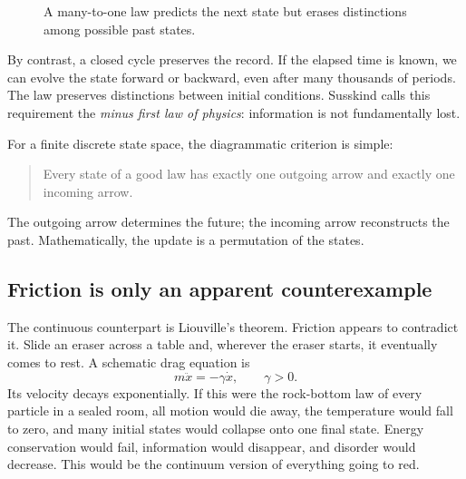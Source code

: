 \begin{figure}[htbp]
\centering
{}
\caption{A many-to-one law predicts the next state but erases distinctions
among possible past states.}
\label{fig:sm1-bad-law}
\end{figure}

By contrast, a closed cycle preserves the record. If the elapsed time is
known, we can evolve the state forward or backward, even after many thousands
of periods. The law preserves distinctions between initial conditions.
Susskind calls this requirement the \emph{minus first law of physics}:
information is not fundamentally lost.

For a finite discrete state space, the diagrammatic criterion is simple:
\begin{quote}
Every state of a good law has exactly one outgoing arrow and exactly one
incoming arrow.
\end{quote}
The outgoing arrow determines the future; the incoming arrow reconstructs
the past. Mathematically, the update is a permutation of the states.

\subsection{Friction is only an apparent counterexample}

The continuous counterpart is Liouville's theorem. Friction appears to
contradict it. Slide an eraser across a table and, wherever the eraser starts,
it eventually comes to rest. A schematic drag equation is
\begin{equation}
 m\ddot x=-\gamma\dot x,
 \qquad \gamma>0.
 \label{eq:sm1-drag}
\end{equation}
Its velocity decays exponentially. If this were the rock-bottom law of every
particle in a sealed room, all motion would die away, the temperature would
fall to zero, and many initial states would collapse onto one final state.
Energy conservation would fail, information would disappear, and disorder
would decrease. This would be the continuum version of everything going to
red.

